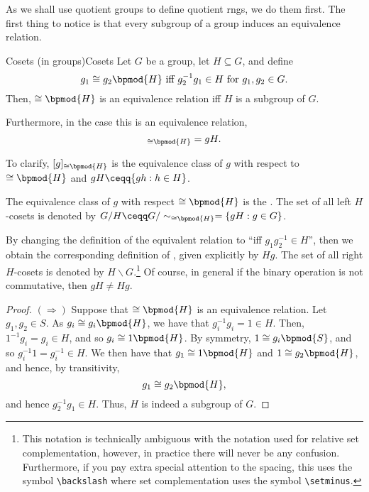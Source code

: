 As we shall use quotient groups to define quotient rngs, we do them first.  The first thing to notice is that every subgroup of a group induces an equivalence relation.
\begin{prp}{Cosets (in groups)}{Cosets}
Let $G$ be a group, let $H\subseteq G$, and define
\begin{equation}\label{eqnA.4.31}
g_1\cong g_2\bpmod{H}\text{ iff }g_2^{-1}g_1\in H\text{ for }g_1,g_2\in G.
\end{equation}
Then, $\cong \bpmod{H}$ is an equivalence relation iff $H$ is a subgroup of $G$.

Furthermore, in the case this is an equivalence relation,
\begin{equation}
[g]_{\cong \bpmod{H}}=gH.
\end{equation}
\begin{rmk}
To clarify, $[g]_{\cong \bpmod{H}}$ is the equivalence class of $g$ with respect to $\cong \bpmod{H}$ and $gH\ceqq \{ gh:h\in H\}$.
\end{rmk}
\begin{rmk}
The equivalence class of $g$ with respect $\cong \bpmod{H}$ is the .  The set of all left $H$-cosets is denoted by $G/H\ceqq G/\sim _{\cong \bpmod{H}}=\left\{ gH:g\in G\right\}$.
\end{rmk}
\begin{rmk}
By changing the definition of the equivalent relation to ``\textellipsis iff $g_1g_2^{-1}\in H$'', then we obtain the corresponding definition of , given explicitly by $Hg$.  The set of all right $H$-cosets is denoted by $H\backslash G$.\footnote{This notation is technically ambiguous with the notation used for relative set complementation, however, in practice there will never be any confusion.  Furthermore, if you pay extra special attention to the spacing, this uses the symbol \texttt{\textbackslash backslash} where set complementation uses the symbol \texttt{\textbackslash setminus}.}  Of course, in general if the binary operation is not commutative, then $gH\neq Hg$.
\end{rmk}
\begin{proof}
$(\Rightarrow )$ Suppose that $\cong \bpmod{H}$ is an equivalence relation.  Let $g_1,g_2\in S$.  As $g_i\cong g_i\bpmod{H}$, we have that $g_i^{-1}g_i=1\in H$.  Then, $1^{-1}g_i=g_i\in H$, and so $g_i\cong 1\bpmod{H}$.  By symmetry, $1\cong g_i\bpmod{S}$, and so $g_i^{-1}1=g_i^{-1}\in H$.  We then have that $g_1\cong 1\bpmod{H}$ and $1\cong g_2\bpmod{H}$, and hence, by transitivity,
\begin{equation}
g_1\cong g_2\bpmod{H},
\end{equation}
and hence $g_2^{-1}g_1\in H$.  Thus, $H$ is indeed a subgroup of $G$.


\end{proof}
\end{prp}
